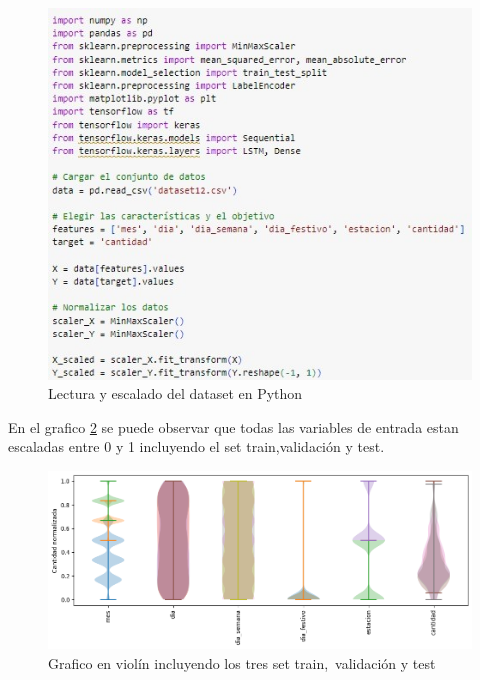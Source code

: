 \begin{figure}[H]
  \begin{center}
    \includegraphics[scale=0.90]{./lectura_escalado.jpg}
    \caption{Lectura y escalado del dataset en Python}
    \label{fig:lectura_escalado}
  \end{center}
\end{figure}

\vspace{1\baselineskip}
En el grafico \ref{fig:grafico_violin} se puede observar que todas las variables de entrada estan escaladas entre 0 y 1 incluyendo el set train,validación y test.
\begin{figure}[H]
  \begin{center}
    \includegraphics[scale=0.50]{./grafico tipo violin de escalado.png}
    \caption{Grafico en violín incluyendo los tres set train, validación y test}
    \label{fig:grafico_violin}
  \end{center}
\end{figure}

